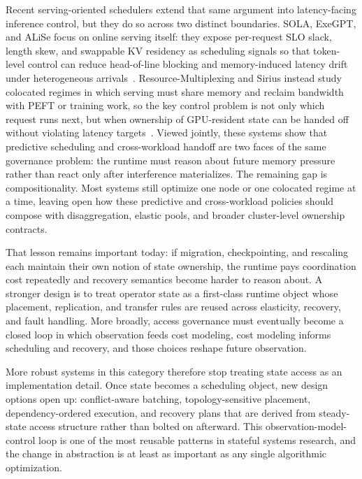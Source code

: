 \documentclass[acmsmall,screen,review]{acmart}
\begin{document}
Recent serving-oriented schedulers extend that same argument into latency-facing inference control, but they do so across two distinct boundaries. SOLA, ExeGPT, and ALiSe focus on online serving itself: they expose per-request SLO slack, length skew, and swappable KV residency as scheduling signals so that token-level control can reduce head-of-line blocking and memory-induced latency drift under heterogeneous arrivals~\cite{hong2025sola,oh2024exegpt,zhao2024alise}. Resource-Multiplexing and Sirius instead study colocated regimes in which serving must share memory and reclaim bandwidth with PEFT or training work, so the key control problem is not only which request runs next, but when ownership of GPU-resident state can be handed off without violating latency targets~\cite{he2025resourcemultiplexing,wang2025sirius}. Viewed jointly, these systems show that predictive scheduling and cross-workload handoff are two faces of the same governance problem: the runtime must reason about future memory pressure rather than react only after interference materializes. The remaining gap is compositionality. Most systems still optimize one node or one colocated regime at a time, leaving open how these predictive and cross-workload policies should compose with disaggregation, elastic pools, and broader cluster-level ownership contracts.

That lesson remains important today: if migration, checkpointing, and rescaling each maintain their own notion of state ownership, the runtime pays coordination cost repeatedly and recovery semantics become harder to reason about. A stronger design is to treat operator state as a first-class runtime object whose placement, replication, and transfer rules are reused across elasticity, recovery, and fault handling. More broadly, access governance must eventually become a closed loop in which observation feeds cost modeling, cost modeling informs scheduling and recovery, and those choices reshape future observation.

More robust systems in this category therefore stop treating state access as an implementation detail. Once state becomes a scheduling object, new design options open up: conflict-aware batching, topology-sensitive placement, dependency-ordered execution, and recovery plans that are derived from steady-state access structure rather than bolted on afterward. This observation-model-control loop is one of the most reusable patterns in stateful systems research, and the change in abstraction is at least as important as any single algorithmic optimization.
\end{document}
